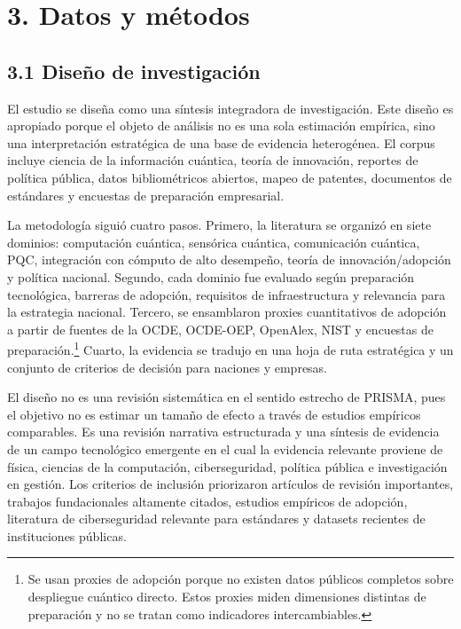 \documentclass[
  11pt,
  letterpaper,
]{article}
\begin{document}
\section{3. Datos y métodos}\label{datos-y-muxe9todos}

\subsection{3.1 Diseño de
investigación}\label{diseuxf1o-de-investigaciuxf3n}

El estudio se diseña como una síntesis integradora de investigación.
Este diseño es apropiado porque el objeto de análisis no es una sola
estimación empírica, sino una interpretación estratégica de una base de
evidencia heterogénea. El corpus incluye ciencia de la información
cuántica, teoría de innovación, reportes de política pública, datos
bibliométricos abiertos, mapeo de patentes, documentos de estándares y
encuestas de preparación empresarial.

La metodología siguió cuatro pasos. Primero, la literatura se organizó
en siete dominios: computación cuántica, sensórica cuántica,
comunicación cuántica, PQC, integración con cómputo de alto desempeño,
teoría de innovación/adopción y política nacional. Segundo, cada dominio
fue evaluado según preparación tecnológica, barreras de adopción,
requisitos de infraestructura y relevancia para la estrategia nacional.
Tercero, se ensamblaron proxies cuantitativos de adopción a partir de
fuentes de la OCDE, OCDE-OEP, OpenAlex, NIST y encuestas de
preparación.\footnote{Se usan proxies de adopción porque no existen
  datos públicos completos sobre despliegue cuántico directo. Estos
  proxies miden dimensiones distintas de preparación y no se tratan como
  indicadores intercambiables.} Cuarto, la evidencia se tradujo en una
hoja de ruta estratégica y un conjunto de criterios de decisión para
naciones y empresas.

El diseño no es una revisión sistemática en el sentido estrecho de
PRISMA, pues el objetivo no es estimar un tamaño de efecto a través de
estudios empíricos comparables. Es una revisión narrativa estructurada y
una síntesis de evidencia de un campo tecnológico emergente en el cual
la evidencia relevante proviene de física, ciencias de la computación,
ciberseguridad, política pública e investigación en gestión. Los
criterios de inclusión priorizaron artículos de revisión importantes,
trabajos fundacionales altamente citados, estudios empíricos de
adopción, literatura de ciberseguridad relevante para estándares y
datasets recientes de instituciones públicas.
\end{document}
